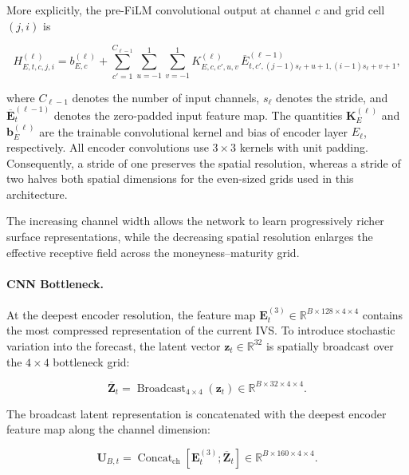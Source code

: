 More explicitly, the pre-FiLM convolutional output at channel $c$ and grid
cell $(j,i)$ is

\begin{equation}\label{eq:ch3:encoder_convolution_element}
H^{(\ell)}_{E,t,c,j,i}
=
b^{(\ell)}_{E,c}
+
\sum_{c'=1}^{C_{\ell-1}}
\sum_{u=-1}^{1}
\sum_{v=-1}^{1}
K^{(\ell)}_{E,c,c',u,v}
\,
\overline{E}^{(\ell-1)}_
{t,c',(j-1)s_\ell+u+1,(i-1)s_\ell+v+1},
\end{equation}

where $C_{\ell-1}$ denotes the number of input channels, $s_\ell$ denotes the stride, and $\overline{\mathbf{E}}^{(\ell-1)}_t$ denotes the zero-padded input feature map. The quantities $\mathbf{K}^{(\ell)}_E$ and $\mathbf{b}^{(\ell)}_E$ are the trainable convolutional kernel and bias of encoder layer $E_\ell$, respectively. All encoder convolutions use $3\times3$ kernels with unit padding. Consequently, a stride of one preserves the spatial resolution, whereas a stride of two halves both spatial dimensions for the even-sized grids used in this architecture.


The increasing channel width allows the network to learn progressively richer surface representations, while the decreasing spatial resolution enlarges the effective receptive field across the moneyness--maturity grid.

\paragraph*{CNN Bottleneck.}
At the deepest encoder resolution, the feature map $\mathbf{E}^{(3)}_t\in\mathbb{R}^{B\times128\times4\times4}$ contains the most compressed representation of the current IVS. To introduce stochastic variation into the forecast, the latent vector $\mathbf{z}_t\in\mathbb{R}^{32}$ is spatially broadcast over the $4\times4$ bottleneck grid:

\begin{equation}\label{eq:ch3:bottleneck_noise_broadcast}
\overline{\mathbf{Z}}_t
=
\operatorname{Broadcast}_{4\times4}(\mathbf{z}_t)
\in
\mathbb{R}^{B\times32\times4\times4}.
\end{equation}

The broadcast latent representation is concatenated with the deepest encoder feature map along the channel dimension:

\begin{equation}\label{eq:ch3:bottleneck_concatenation}
\mathbf{U}_{B,t}
=
\operatorname{Concat}_{\mathrm{ch}}
\left[
\mathbf{E}^{(3)}_t;
\overline{\mathbf{Z}}_t
\right]
\in
\mathbb{R}^{B\times160\times4\times4}.
\end{equation}

